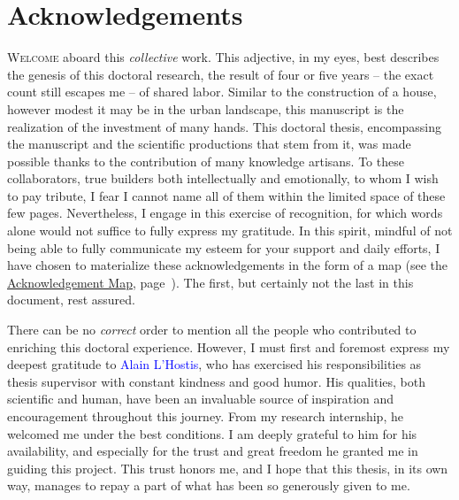 
    \cleardoublepage
\chapter*{Acknowledgements
    \label{body:remerciements}
    }

\lettrine[lines=3, findent=8pt, nindent=0pt]{ W}{elcome} aboard this \textsl{collective} work. This adjective, in my eyes, best describes the genesis of this doctoral research, the result of four or five years – the exact count still escapes me – of shared labor. Similar to the construction of a house, however modest it may be in the urban landscape, this manuscript is the realization of the investment of many hands. This doctoral thesis, encompassing the manuscript and the scientific productions that stem from it, was made possible thanks to the contribution of many knowledge artisans. To these collaborators, true builders both intellectually and emotionally, to whom I wish to pay tribute, I fear I cannot name all of them within the limited space of these few pages. Nevertheless, I engage in this exercise of recognition, for which words alone would not suffice to fully express my gratitude. In this spirit, mindful of not being able to fully communicate my esteem for your support and daily efforts, I have chosen to materialize these acknowledgements in the form of a map (see the \hyperref[fig-introduction:remerciements]{Acknowledgement Map}, page~\pageref{fig-introduction:remerciements}). The first, but certainly not the last in this document, rest assured.%

There can be no \textsl{correct} order to mention all the people who contributed to enriching this doctoral experience. However, I must first and foremost express my deepest gratitude to \textcolor{blue}{Alain L'Hostis}, who has exercised his responsibilities as thesis supervisor with constant kindness and good humor. His qualities, both scientific and human, have been an invaluable source of inspiration and encouragement throughout this journey. From my research internship, he welcomed me under the best conditions. I am deeply grateful to him for his availability, and especially for the trust and great freedom he granted me in guiding this project. This trust honors me, and I hope that this thesis, in its own way, manages to repay a part of what has been so generously given to me.%

